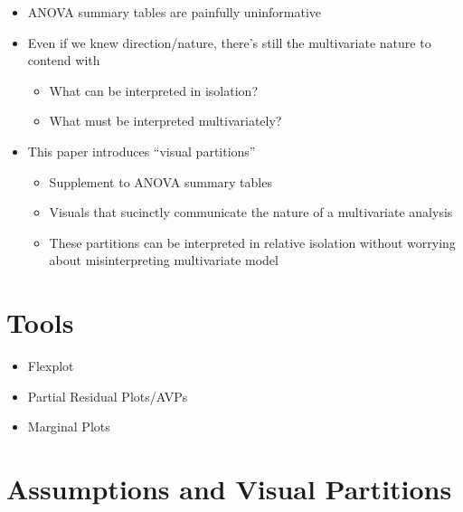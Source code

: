 \documentclass[
  english,
  doc,floatsintext]{apa6}
\providecommand{\tightlist}{%
  \setlength{\itemsep}{0pt}\setlength{\parskip}{0pt}}
\begin{document}
\begin{itemize}
\tightlist
\item
  ANOVA summary tables are painfully uninformative
\item
  Even if we knew direction/nature, there's still the multivariate nature to contend with

  \begin{itemize}
  \tightlist
  \item
    What can be interpreted in isolation?
  \item
    What must be interpreted multivariately?
  \end{itemize}
\item
  This paper introduces ``visual partitions''

  \begin{itemize}
  \tightlist
  \item
    Supplement to ANOVA summary tables
  \item
    Visuals that sucinctly communicate the nature of a multivariate analysis
  \item
    These partitions can be interpreted in relative isolation without worrying about misinterpreting multivariate model
  \end{itemize}
\end{itemize}

\hypertarget{tools}{%
\section{Tools}\label{tools}}

\begin{itemize}
\tightlist
\item
  Flexplot
\item
  Partial Residual Plots/AVPs
\item
  Marginal Plots
\end{itemize}

\hypertarget{assumptions-and-visual-partitions}{%
\section{Assumptions and Visual Partitions}\label{assumptions-and-visual-partitions}}
\end{document}
